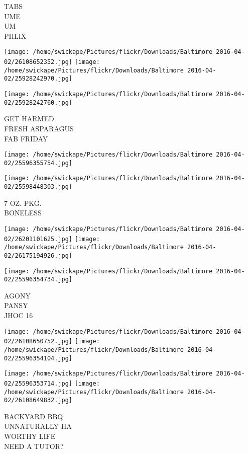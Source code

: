 \documentclass[10pt,letterpaper]{article}
\begin{document}
TABS\\
UME\\
UM\\
PHLIX
\pagebreak

\texttt{[image: /home/swickape/Pictures/flickr/Downloads/Baltimore 2016-04-02/26108652352.jpg]}
\texttt{[image: /home/swickape/Pictures/flickr/Downloads/Baltimore 2016-04-02/25928242970.jpg]}

\texttt{[image: /home/swickape/Pictures/flickr/Downloads/Baltimore 2016-04-02/25928242760.jpg]}

GET HARMED\\
FRESH ASPARAGUS\\
FAB FRIDAY
\pagebreak

\texttt{[image: /home/swickape/Pictures/flickr/Downloads/Baltimore 2016-04-02/25596355754.jpg]}

\vspace{0.25in}
\texttt{[image: /home/swickape/Pictures/flickr/Downloads/Baltimore 2016-04-02/25598448303.jpg]}

7 OZ. PKG.\\
BONELESS
\pagebreak

\texttt{[image: /home/swickape/Pictures/flickr/Downloads/Baltimore 2016-04-02/26201101625.jpg]}
\texttt{[image: /home/swickape/Pictures/flickr/Downloads/Baltimore 2016-04-02/26175194926.jpg]}

\vspace{0.25in}
\texttt{[image: /home/swickape/Pictures/flickr/Downloads/Baltimore 2016-04-02/25596354734.jpg]}

AGONY\\
PANSY\\
JHOC 16
\pagebreak

\texttt{[image: /home/swickape/Pictures/flickr/Downloads/Baltimore 2016-04-02/26108650752.jpg]}
\texttt{[image: /home/swickape/Pictures/flickr/Downloads/Baltimore 2016-04-02/25596354104.jpg]}

\texttt{[image: /home/swickape/Pictures/flickr/Downloads/Baltimore 2016-04-02/25596353714.jpg]}
\texttt{[image: /home/swickape/Pictures/flickr/Downloads/Baltimore 2016-04-02/26108649832.jpg]}

BACKYARD BBQ\\
UNNATURALLY HA\\
WORTHY LIFE\\
NEED A TUTOR?
\pagebreak
\end{document}
